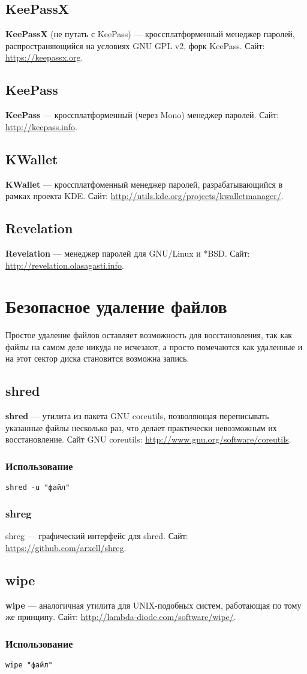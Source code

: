 \subsection{KeePassX}
\textbf{KeePassX} (не путать с KeePass) --- кроссплатформенный менеджер паролей, распространяющийся на условиях GNU GPL v2, форк KeePass. Сайт: \url{https://keepassx.org}.
\subsection{KeePass}
\textbf{KeePass} --- кроссплатформенный (через Mono) менеджер паролей. Сайт: \url{http://keepass.info}.
\subsection{KWallet}
\textbf{KWallet} --- кроссплатфоменный менеджер паролей, разрабатывающийся в рамках проекта KDE. Сайт: \url{http://utils.kde.org/projects/kwalletmanager/}.
\subsection{Revelation}
\textbf{Revelation} --- менеджер паролей для GNU/Linux и *BSD. Сайт: \url{http://revelation.olasagasti.info}.

\section{Безопасное удаление файлов}
\begin{important}
Простое удаление файлов оставляет возможность для восстановления, так как файлы на самом деле никуда не исчезают, а просто помечаются как удаленные и на этот сектор диска становится возможна запись.
\end{important}
\subsection{shred}
\textbf{shred} --- утилита из пакета GNU coreutils, позволяющая переписывать указанные файлы несколько раз, что делает практически невозможным их восстановление. Сайт GNU coreutils: \url{http://www.gnu.org/software/coreutils}.
\subsubsection{Использование}
\begin{lstlisting}
shred -u "файл"
\end{lstlisting}
\subsubsection{shreg}
shreg --- графический интерфейс для shred. Сайт: \url{https://github.com/arxell/shreg}.
\subsection{wipe}
\textbf{wipe} --- аналогичная утилита для UNIX-подобных систем, работающая по тому же принципу. Сайт: \url{http://lambda-diode.com/software/wipe/}.
\subsubsection{Использование}
\begin{lstlisting}
wipe "файл"
\end{lstlisting}

